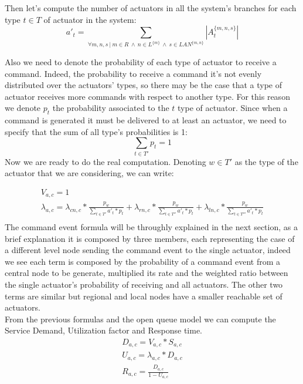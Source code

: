 \documentclass[11pt]{article}
\begin{document}
Then let's compute the number of actuators in all the system's branches for each type $t \in T$ of actuator in the system:
\begin{equation}
    a'_{t} = \sum_{\forall m,n,s \ | \ m \in R \ \land \ n \in L^{\{m\}} \ \land \ s \in LAN^{\{m, n\}}}{ |A^{\{m, n, s\}}_{t}| }
\end{equation}


Also we need to denote the probability of each type of actuator to receive a command. Indeed, the probability to receive a command it's not evenly distributed over the actuators' types, so there may be the case that a type of actuator receives more commands with respect to another type.
For this reason we denote $p_t$ the probability associated to the $t$ type of actuator.
Since when a command is generated it must be delivered to at least an actuator, we need to specify that the sum of all type's probabilities is 1:
\begin{equation}
    \sum_{t \in T'}{p_t} = 1
\end{equation}
Now we are ready to do the real computation. Denoting $w \in T'$ as the type of the actuator that we are considering, we can write:

\begin{equation}
	\begin{array}{l}
		V_{a,c} = 1 \\

		\lambda_{a, c} = \lambda_{cn, c} * \frac{p_{w}}{\sum\limits_{t \in T'}{a'_{t} * p_{t}}} + \lambda_{rn, c} *\frac{p_{w}}{\sum\limits_{t \in T''}{a'_{t} * p_{t}}} + \lambda_{ln, c} * \frac{p_{w}}{\sum\limits_{t \in T'''}{a'_{t} * p_{t}}}   \\
	\end{array}
\end{equation}
The command event formula will be throughly explained in the next section, as a brief explanation it is composed by three members, each representing the case of a different level node sending the command event to the single actuator, indeed we see each term is composed by the probability of a command event from a central node to be generate, multiplied its rate and the weighted ratio between the single actuator's probability of receiving and all actuators. The other two terms are similar but regional and local nodes have a smaller reachable set of actuators.\\
From the previous formulas and the open queue model we can compute the Service Demand, Utilization factor and Response time.
\begin{equation}
	\begin{array}{l}
		D_{a, c} = V_{a, c} * S_{a, c} \\
		U_{a, c} = \lambda_{a, c} * D_{a, c} \\
		R_{a, c} = \frac{D_{a, c}}{1 - U_{a,c}} \\
	\end{array}
\end{equation}
\end{document}
